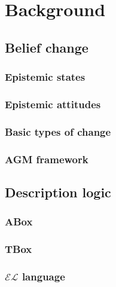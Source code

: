 \chapter{Background}
\section{Belief change}
\subsection{Epistemic states}
\subsection{Epistemic attitudes}
\subsection{Basic types of change}
\subsection{AGM framework}
\section{Description logic}
\subsection{ABox}
\subsection{TBox}
\subsection{$\mathcal{EL}$ language}